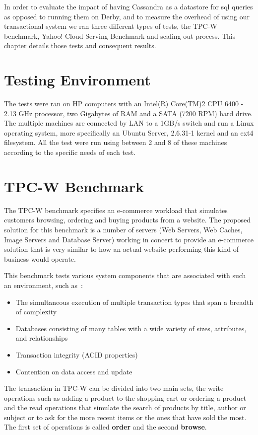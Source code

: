 In order to evaluate the impact of having Cassandra as a datastore for \ac{sql} queries as opposed to running them on Derby, and to measure the overhead of using our transactional system we ran three different types of tests, the TPC-W benchmark, Yahoo! Cloud Serving Benchmark and scaling out process. This chapter details those tests and consequent results. 

\section{Testing Environment}
The tests were ran on HP computers with an Intel(R) Core(TM)2 CPU 6400 - 2.13 GHz processor, two Gigabytes of RAM and a SATA (7200 RPM) hard drive. The multiple machines are connected by LAN to a 1GB/s switch and run a Linux operating system, more specifically an Ubuntu Server, 2.6.31-1 kernel and an ext4 filesystem. 
All the test were run using between 2 and 8 of these machines according to the specific needs of each test. 

\section{TPC-W Benchmark}
The TPC-W benchmark specifies an e-commerce workload that simulates customers browsing, ordering and buying products from a website. The proposed solution for this benchmark is a number of servers (Web Servers, Web Caches, Image Servers and Database Server) working in concert to provide an e-commerce solution that is very similar to how an actual website performing this kind of business would operate. 

This benchmark tests various system components that are associated with such an environment, such as~\cite{tpcw}:

\begin{itemize}
	\item The simultaneous execution of multiple transaction types that span a breadth of complexity
	\item Databases consisting of many tables with a wide variety of sizes, attributes, and relationships
	\item Transaction integrity (ACID properties)
	\item Contention on data access and update
\end{itemize}

The transaction in TPC-W can be divided into two main sets, the write operations such as adding a product to the shopping cart or ordering a product and the read operations that simulate the search of products by title, author or subject or to ask for the more recent items or the ones that have sold the most. The first set of operations is called \textbf{order} and the second \textbf{browse}.

